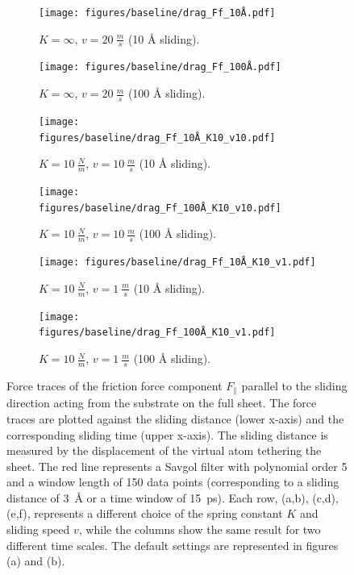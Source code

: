 \begin{figure}[H]
  \centering
  \begin{subfigure}[t]{0.49\textwidth}
      \centering
      \texttt{[image: figures/baseline/drag\_Ff\_10Å.pdf]}
      \caption{$K = \infty$, $v = \SI{20}{\frac{m}{s}}$ (10 Å sliding).}
      \label{fig:drag_Ff_10}
  \end{subfigure}
  \hfill
  \begin{subfigure}[t]{0.49\textwidth}
      \centering
      \texttt{[image: figures/baseline/drag\_Ff\_100Å.pdf]}
      \caption{$K = \infty$, $v = \SI{20}{\frac{m}{s}}$ (100 Å sliding).}
      \label{fig:drag_Ff_100}
    \end{subfigure}
    \hfill
    \begin{subfigure}[t]{0.49\textwidth}
      \centering
      \texttt{[image: figures/baseline/drag\_Ff\_10Å\_K10\_v10.pdf]}
      \caption{$K = \SI{10}{\frac{N}{m}}$, $v = \SI{10}{\frac{m}{s}}$ (10 Å sliding).}
      \label{fig:drag_Ff_10_K10_v10}
    \end{subfigure}
    \hfill
    \begin{subfigure}[t]{0.49\textwidth}
      \centering
      \texttt{[image: figures/baseline/drag\_Ff\_100Å\_K10\_v10.pdf]}
      \caption{$K = \SI{10}{\frac{N}{m}}$, $v = \SI{10}{\frac{m}{s}}$ (100 Å sliding).}
      \label{fig:drag_Ff_100_K10_v10}
  \end{subfigure}
  \hfill
    \begin{subfigure}[t]{0.49\textwidth}
      \centering
      \texttt{[image: figures/baseline/drag\_Ff\_10Å\_K10\_v1.pdf]}
      \caption{$K = \SI{10}{\frac{N}{m}}$, $v = \SI{1}{\frac{m}{s}}$ (10 Å sliding).}
      \label{fig:drag_Ff_10_K10_v1}
    \end{subfigure}
    \hfill
    \begin{subfigure}[t]{0.49\textwidth}
      \centering
      \texttt{[image: figures/baseline/drag\_Ff\_100Å\_K10\_v1.pdf]}
      \caption{$K = \SI{10}{\frac{N}{m}}$, $v = \SI{1}{\frac{m}{s}}$ (100 Å sliding).}
      \label{fig:drag_Ff_100_K10_v1}
  \end{subfigure}
  \hfill
     \caption{Force traces of the friction force component $F_\parallel$ parallel to the sliding direction acting from the substrate on the full sheet. The force traces are plotted against the sliding distance (lower x-axis) and the corresponding sliding time (upper x-axis). The sliding distance is measured by the displacement of the virtual atom tethering the sheet. The red line represents a Savgol filter with polynomial order 5 and a window length of 150 data points (corresponding to a sliding distance of \SI{3}{Å} or a time window of \SI{15}{ps}). Each row, (a,b), (c,d), (e,f), represents a different choice of the spring constant $K$ and sliding speed $v$, while the columns show the same result for two different time scales. The default settings are represented in figures (a) and (b).}
     \label{fig:drag_Ff}
\end{figure}

